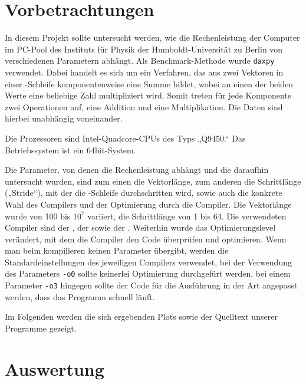 \section{Vorbetrachtungen}
In diesem Projekt sollte untersucht werden, wie die Rechenleistung der Computer
im PC-Pool des Instituts für Physik der Humboldt-Universität zu Berlin von
verschiedenen Parametern abhängt. Als Benchmark-Methode wurde \texttt{daxpy}
verwendet. Dabei handelt es sich um ein Verfahren, das aus zwei Vektoren in einer \for-Schleife
komponentenweise eine Summe bildet, wobei an einen der beiden Werte eine
beliebige Zahl multipliziert wird. Somit treten für jede Komponente zwei
Operationen auf, eine Addition und eine Multiplikation. Die Daten sind hierbei 
unabhängig voneinander.

Die Prozessoren sind Intel-Quadcore-CPUs des Typs „Q9450.“ Das Betriebssystem ist
ein 64bit-System.

Die Parameter, von denen die Rechenleistung abhängt und die daraufhin untersucht
wurden, sind zum einen die Vektorlänge, zum anderen die Schrittlänge („Stride“),
mit der die \for-Schleife durchschritten wird,
sowie auch die konkrete Wahl des Compilers und der Optimierung durch die 
Compiler. Die Vektorlänge wurde von 100 bis $10^7$ variiert, die Schrittlänge 
von 1 bis 64. Die verwendeten Compiler sind der \gcc, der \icc sowie der \pgcc.
Weiterhin wurde das Optimierungslevel verändert, mit dem die Compiler den Code 
überprüfen und optimieren. Wenn man beim kompilieren keinen Parameter übergibt, 
werden die Standardeinstellungen des jeweiligen Compilers verwendet, bei der
Verwendung des Parameters \texttt{-o0} sollte keinerlei Optimierung durchgefürt
werden, bei einem Parameter \texttt{-o3} hingegen sollte der Code für die
Ausführung in der Art angepasst werden, dass das Programm schnell läuft.

Im Folgenden werden die sich ergebenden Plots sowie der Quelltext unserer Programme
gezeigt.



\section{Auswertung}
